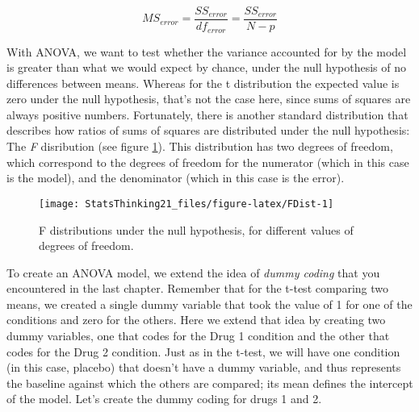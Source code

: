 \documentclass[]{book}
\newenvironment{Shaded}{\begin{snugshade}}{\end{snugshade}}
\newcommand{\KeywordTok}[1]{\textcolor[rgb]{0.13,0.29,0.53}{\textbf{#1}}}
\newcommand{\DataTypeTok}[1]{\textcolor[rgb]{0.13,0.29,0.53}{#1}}
\newcommand{\StringTok}[1]{\textcolor[rgb]{0.31,0.60,0.02}{#1}}
\newcommand{\CommentTok}[1]{\textcolor[rgb]{0.56,0.35,0.01}{\textit{#1}}}
\newcommand{\OperatorTok}[1]{\textcolor[rgb]{0.81,0.36,0.00}{\textbf{#1}}}
\newcommand{\NormalTok}[1]{#1}
\theoremstyle{definition}
\theoremstyle{definition}
\theoremstyle{definition}
\theoremstyle{remark}
\begin{document}
\[
MS_{error} = \frac{SS_{error}}{df_{error}} = \frac{SS_{error}}{N - p}
\]

With ANOVA, we want to test whether the variance accounted for by the
model is greater than what we would expect by chance, under the null
hypothesis of no differences between means. Whereas for the t
distribution the expected value is zero under the null hypothesis,
that's not the case here, since sums of squares are always positive
numbers. Fortunately, there is another standard distribution that
describes how ratios of sums of squares are distributed under the null
hypothesis: The \emph{F} disribution (see figure \ref{fig:FDist}). This
distribution has two degrees of freedom, which correspond to the degrees
of freedom for the numerator (which in this case is the model), and the
denominator (which in this case is the error).

\begin{figure}
\texttt{[image: StatsThinking21\_files/figure-latex/FDist-1]} \caption{F distributions under the null hypothesis, for different values of degrees of freedom.}\label{fig:FDist}
\end{figure}

To create an ANOVA model, we extend the idea of \emph{dummy coding} that
you encountered in the last chapter. Remember that for the t-test
comparing two means, we created a single dummy variable that took the
value of 1 for one of the conditions and zero for the others. Here we
extend that idea by creating two dummy variables, one that codes for the
Drug 1 condition and the other that codes for the Drug 2 condition. Just
as in the t-test, we will have one condition (in this case, placebo)
that doesn't have a dummy variable, and thus represents the baseline
against which the others are compared; its mean defines the intercept of
the model. Let's create the dummy coding for drugs 1 and 2.

\begin{Shaded}
\end{Shaded}
\end{document}
